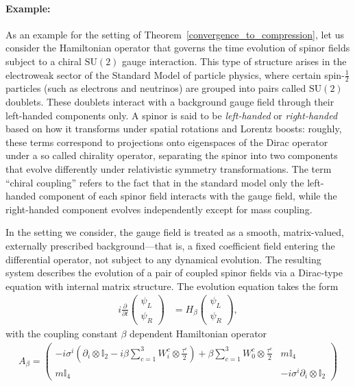\documentclass[reqno,12pt,letterpaper]{amsart}
\numberwithin{equation}{section}
\newcommand{\1}{\mathds{1}}
\theoremstyle{definition}
\begin{document}
	\paragraph{Example:}	
	As an example for the setting of Theorem~\ref{convergence_to_compression}, let us consider the Hamiltonian operator that governs the time evolution of spinor fields subject to a chiral \(\mathrm{SU}(2)\) gauge interaction. This type of structure arises in the electroweak sector of the Standard Model of particle physics, where certain spin-\(\tfrac{1}{2}\) particles (such as electrons and neutrinos) are grouped into pairs called \(\mathrm{SU}(2)\) doublets. These doublets interact with a background gauge field through their left-handed components only. A spinor is said to be \emph{left-handed} or \emph{right-handed} based on how it transforms under spatial rotations and Lorentz boosts: roughly, these terms correspond to projections onto eigenspaces of the Dirac operator under a so called chirality operator, 
	separating the spinor into two components that evolve differently under relativistic symmetry transformations. The term “chiral coupling” refers to the fact that in the standard model only the left-handed component of each spinor field interacts with the gauge field, while the right-handed component evolves independently except for mass coupling.
	
	In the setting we consider, the gauge field is treated as a smooth, matrix-valued, externally prescribed background---that is, a fixed coefficient field entering the differential operator, not subject to any dynamical evolution. The resulting system describes the evolution of a pair of coupled spinor fields via a Dirac-type equation with internal matrix structure. The evolution equation takes the form
	\begin{align}
		i \frac{\partial}{\partial t} 
		\begin{pmatrix}
			\psi_L \\
			\psi_R
		\end{pmatrix}
		&=
		H_\beta
		\begin{pmatrix}
			\psi_L \\
			\psi_R
		\end{pmatrix},
	\end{align}
	with  the coupling constant $\beta$ dependent Hamiltonian operator
	\begin{align}
		A_\beta = 	\begin{pmatrix}
			- i \sigma^i \left( \partial_i \otimes \mathbb{I}_2 - i \beta \sum_{c=1}^3 W_i^c \otimes \frac{\tau^c}{2} \right) 
			+ \beta \sum_{c=1}^3 W_0^c \otimes \frac{\tau^c}{2}
			& m \mathbb{I}_4 \\
			m \mathbb{I}_4 & -i \sigma^i \partial_i \otimes \mathbb{I}_2
		\end{pmatrix}
	\end{align}
	
\end{document}
